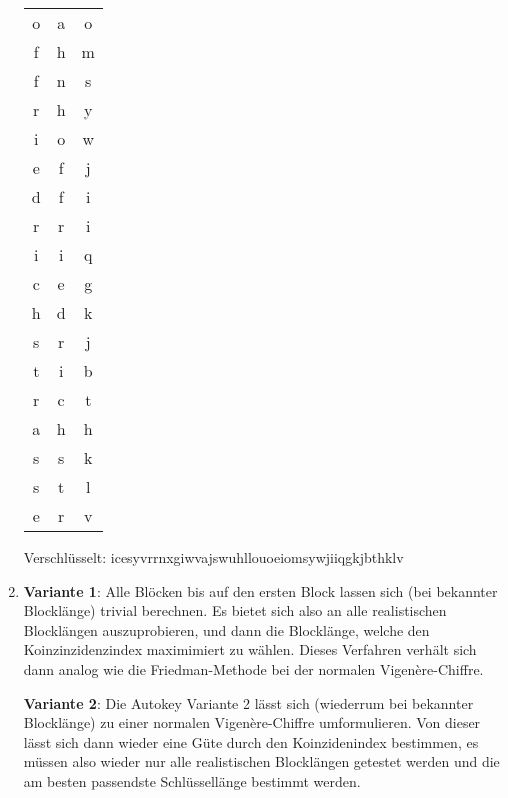 \documentclass[DIN, pagenumber=false, fontsize=11pt, parskip=half]{scrartcl}
\begin{document}
\begin{enumerate}[label=\alph*)]
\begin{table}[H]
\begin{tabular}{ccc}
                    o & a & o \\
                    f & h & m \\
                    f & n & s \\
                    r & h & y \\
                    i & o & w \\
                    e & f & j \\
                    d & f & i \\
                    r & r & i \\
                    i & i & q \\
                    c & e & g \\
                    h & d & k \\
                    s & r & j \\
                    t & i & b \\
                    r & c & t \\
                    a & h & h \\
                    s & s & k \\
                    s & t & l \\
                    e & r & v \\
                    \bottomrule
                \end{tabular}
            \end{table}

            Verschlüsselt: \glqq{}icesyvrrnxgiwvajswuhllouoeiomsywjiiqgkjbthklv\grqq{}
        \item
            \textbf{Variante 1}: Alle Blöcken bis auf den ersten Block lassen sich (bei bekannter Blocklänge)
            trivial berechnen. Es bietet sich also an alle realistischen Blocklängen auszuprobieren,
            und dann die Blocklänge, welche den Koinzinzidenzindex maximimiert zu wählen.
            Dieses Verfahren verhält sich dann analog wie die Friedman-Methode bei der normalen Vigenère-Chiffre.
    
            \textbf{Variante 2}: Die Autokey Variante 2 lässt sich (wiederrum bei bekannter Blocklänge) zu einer normalen Vigenère-Chiffre umformulieren. Von dieser lässt
            sich dann wieder eine Güte durch den Koinzidenindex bestimmen,
            es müssen also wieder nur alle realistischen Blocklängen getestet werden
            und die am besten passendste Schlüssellänge bestimmt werden.
    \end{enumerate}
\end{document}
